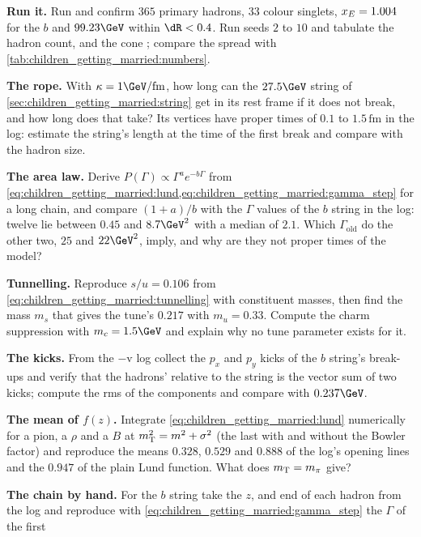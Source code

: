 \begin{exercises}
\item \textbf{Run it.} Run  and confirm
  $365$ primary hadrons, $33$ colour singlets, $x_E=1.004$ for the $b$ and
  $99.23\GeV$ within $\dR<0.4$. Run seeds $2$ to $10$ and tabulate the
  hadron count, \xE and the cone \pt; compare the spread with
  \cref{tab:children_getting_married:numbers}.
\item \textbf{The rope.} With $\kappa=1\GeV/\mathrm{fm}$, how long can the
  $27.5\GeV$ string of \cref{sec:children_getting_married:string} get in
  its rest frame if it does not break, and how long does that take? Its
  vertices have proper times of $0.1$ to $1.5\,\mathrm{fm}$ in the
   log: estimate the
  string's length at the time of the first break and compare with the
  hadron size.
\item \textbf{The area law.} Derive $P(\Gamma)\propto\Gamma^ae^{-b\Gamma}$
  from \cref{eq:children_getting_married:lund,eq:children_getting_married:gamma_step}
  for a long chain, and compare $(1+a)/b$ with the $\Gamma$ values of the
  $b$ string in the log: twelve lie between $0.45$ and $8.7\GeV^2$ with a
  median of $2.1$. Which $\Gamma_{\mathrm{old}}$ do the other two, $25$
  and $22\GeV^2$, imply, and why are they not proper times of the model?
\item \textbf{Tunnelling.} Reproduce $s/u=0.106$ from
  \cref{eq:children_getting_married:tunnelling} with constituent masses,
  then find the mass $m_s$ that gives the tune's $0.217$ with $m_u=0.33$.
  Compute the charm suppression with $m_c=1.5\GeV$ and explain why no
  tune parameter exists for it.
\item \textbf{The kicks.} From the $-$v log collect the $p_x$ and $p_y$
  kicks of the $b$ string's break-ups and verify that the hadrons' \pt
  relative to the string is the vector sum of two kicks; compute the rms of
  the components and compare with $0.237\GeV$.
\item \textbf{The mean of $f(z)$.} Integrate
  \cref{eq:children_getting_married:lund} numerically for a pion, a $\rho$
  and a $B$ at $m_{\mathrm{T}}^2=m^2+\sigma^2$ (the last with and without the Bowler
  factor) and reproduce the means $0.328$, $0.529$ and $0.888$ of the
  log's opening lines and the $0.947$ of the plain Lund function. What
  does $m_{\mathrm{T}}=m_\pi$ give?
\item \textbf{The chain by hand.} For the $b$ string take the $z$, \mT and
  end of each hadron from the log and reproduce with
  \cref{eq:children_getting_married:gamma_step} the $\Gamma$ of the first

\end{exercises}
